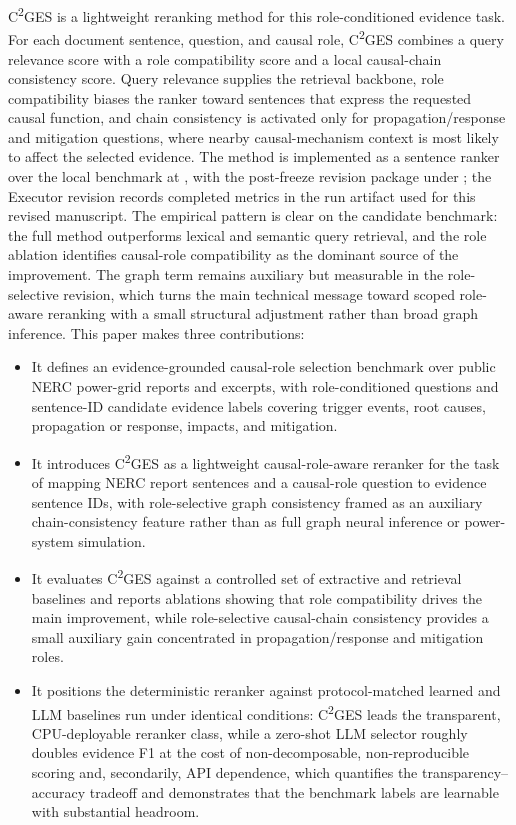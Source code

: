 \documentclass{ieeeaccess}
\begin{document}
C\textsuperscript{2}GES is a lightweight reranking method for this role-conditioned evidence task. For each document sentence, question, and causal role, C\textsuperscript{2}GES combines a query relevance score with a role compatibility score and a local causal-chain consistency score. Query relevance supplies the retrieval backbone, role compatibility biases the ranker toward sentences that express the requested causal function, and chain consistency is activated only for propagation/response and mitigation questions, where nearby causal-mechanism context is most likely to affect the selected evidence. The method is implemented as a sentence ranker over the local benchmark at , with the post-freeze revision package under ; the Executor revision records completed metrics in the run artifact used for this revised manuscript. The empirical pattern is clear on the candidate benchmark: the full method outperforms lexical and semantic query retrieval, and the role ablation identifies causal-role compatibility as the dominant source of the improvement. The graph term remains auxiliary but measurable in the role-selective revision, which turns the main technical message toward scoped role-aware reranking with a small structural adjustment rather than broad graph inference. This paper makes three contributions:

\begin{itemize}
  \item It defines an evidence-grounded causal-role selection benchmark over public NERC power-grid reports and excerpts, with role-conditioned questions and sentence-ID candidate evidence labels covering trigger events, root causes, propagation or response, impacts, and mitigation.
  \item It introduces C\textsuperscript{2}GES as a lightweight causal-role-aware reranker for the task of mapping NERC report sentences and a causal-role question to evidence sentence IDs, with role-selective graph consistency framed as an auxiliary chain-consistency feature rather than as full graph neural inference or power-system simulation.
  \item It evaluates C\textsuperscript{2}GES against a controlled set of extractive and retrieval baselines and reports ablations showing that role compatibility drives the main improvement, while role-selective causal-chain consistency provides a small auxiliary gain concentrated in propagation/response and mitigation roles.
  \item It positions the deterministic reranker against protocol-matched learned and LLM baselines run under identical conditions: C\textsuperscript{2}GES leads the transparent, CPU-deployable reranker class, while a zero-shot LLM selector roughly doubles evidence F1 at the cost of non-decomposable, non-reproducible scoring and, secondarily, API dependence, which quantifies the transparency--accuracy tradeoff and demonstrates that the benchmark labels are learnable with substantial headroom.
\end{itemize}
\end{document}
